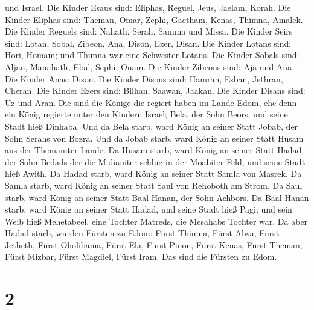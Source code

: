 und Israel.  Die Kinder Esaus sind: Eliphas, Reguel, Jeus,
Jaelam, Korah.  Die Kinder Eliphas sind: Theman, Omar,
Zephi, Gaetham, Kenas, Thimna, Amalek.  Die Kinder Reguels
sind: Nahath, Serah, Samma und Missa.  Die Kinder Seirs
sind: Lotan, Sobal, Zibeon, Ana, Dison, Ezer, Disan.  Die
Kinder Lotans sind: Hori, Homam; und Thimna war eine Schwester Lotans.
 Die Kinder Sobals sind: Aljan, Manahath, Ebal, Sephi,
Onam. Die Kinder Zibeons sind: Aja und Ana.  Die Kinder
Anas: Dison. Die Kinder Disons sind: Hamran, Esban, Jethran, Cheran.
 Die Kinder Ezers sind: Bilhan, Saawan, Jaakan. Die Kinder
Disans sind: Uz und Aran.  Die sind die Könige die regiert
haben im Lande Edom, ehe denn ein König regierte unter den Kindern
Israel; Bela, der Sohn Beors; und seine Stadt hieß Dinhaba.
 Und da Bela starb, ward König an seiner Statt Jobab, der
Sohn Serahs von Bozra.  Und da Jobab starb, ward König an
seiner Statt Husam aus der Themaniter Lande.  Da Husam
starb, ward König an seiner Statt Hadad, der Sohn Bedads der die
Midianiter schlug in der Moabiter Feld; und seine Stadt hieß Awith.
 Da Hadad starb, ward König an seiner Statt Samla von
Masrek.  Da Samla starb, ward König an seiner Statt Saul
von Rehoboth am Strom.  Da Saul starb, ward König an seiner
Statt Baal-Hanan, der Sohn Achbors.  Da Baal-Hanan starb,
ward König an seiner Statt Hadad, und seine Stadt hieß Pagi; und sein
Weib hieß Mehetabeel, eine Tochter Matreds, die Mesahabs Tochter war.
 Da aber Hadad starb, wurden Fürsten zu Edom: Fürst Thimna,
Fürst Alwa, Fürst Jetheth,  Fürst Oholibama, Fürst Ela,
Fürst Pinon,  Fürst Kenas, Fürst Theman, Fürst Mizbar,
 Fürst Magdiel, Fürst Iram. Das sind die Fürsten zu Edom.

\hypertarget{section-1}{%
\section{2}\label{section-1}}

